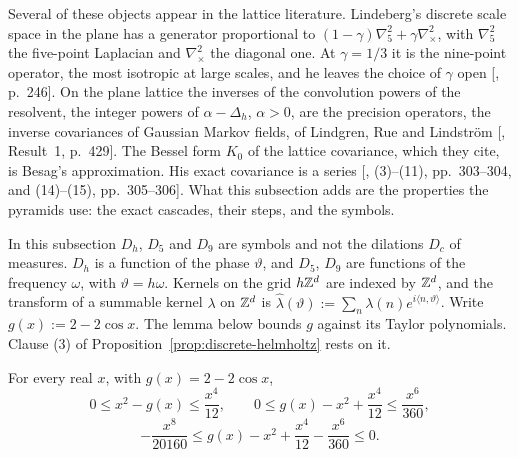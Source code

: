 Several of these objects appear in the lattice literature. Lindeberg's discrete scale space in the plane has
a generator proportional to $(1 - \gamma)\nabla^2_5 + \gamma\nabla^2_\times$, with $\nabla^2_5$ the
five-point Laplacian and $\nabla^2_\times$ the diagonal one. At $\gamma = 1/3$ it is the
nine-point operator, the most isotropic at large scales, and he leaves the choice of $\gamma$ open
[, p.~246]. On the plane lattice the inverses of the convolution
powers of the resolvent, the integer powers of $\alpha - \Delta_h$, $\alpha > 0$, are the precision
operators, the inverse covariances of Gaussian Markov fields, of Lindgren, Rue and Lindstr\"om
[, Result~1, p.~429]. The Bessel form
$K_0$ of the lattice covariance, which they cite, is Besag's approximation. His exact covariance
is a series [, (3)--(11), pp.~303--304, and (14)--(15), pp.~305--306]. What this
subsection adds are the properties the pyramids use: the exact cascades, their steps, and the
symbols.

In this subsection $D_h$, $D_5$ and $D_9$ are symbols and not the dilations $D_c$ of measures.
$D_h$ is a function of the phase $\vartheta$, and $D_5$, $D_9$ are functions of the frequency
$\omega$, with $\vartheta = h\omega$. Kernels on the grid $h\mathbb{Z}^d$ are indexed by $\mathbb{Z}^d$, and the
transform of a summable kernel $\lambda$ on $\mathbb{Z}^d$ is $\widehat\lambda(\vartheta) := \sum_n \lambda(n)
e^{i\langle n, \vartheta\rangle}$. Write $g(x) := 2 - 2\cos x$. The lemma below bounds $g$ against
its Taylor polynomials. Clause (3) of Proposition~\ref{prop:discrete-helmholtz} rests on it.

\begin{lemma}
\label{lem:cosine-bounds}

For every real $x$, with $g(x) = 2 - 2\cos x$,
\[
  0 \le x^2 - g(x) \le \frac{x^4}{12}, \qquad
  0 \le g(x) - x^2 + \frac{x^4}{12} \le \frac{x^6}{360},
\]
\[
  -\frac{x^8}{20160} \le g(x) - x^2 + \frac{x^4}{12} - \frac{x^6}{360} \le 0 .
\]
\end{lemma}

